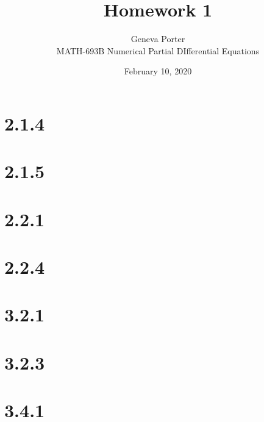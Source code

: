 \documentclass[12pt]{article}
\title{Homework 1}
\author{Geneva Porter\\ 
MATH-693B Numerical Partial DIfferential Equations\\}
\date{February 10, 2020}
\begin{document}
\maketitle

\section*{2.1.4}


\section*{2.1.5}


\section*{2.2.1}


\section*{2.2.4}


\section*{3.2.1}


\section*{3.2.3}


\section*{3.4.1}
\end{document}
